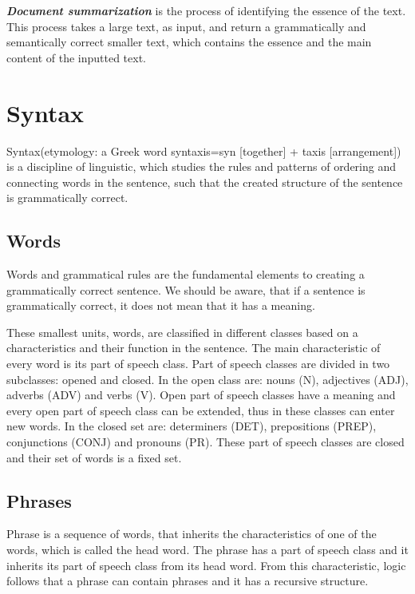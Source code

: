 \emph{\textbf{Document summarization}}  is the process of identifying the essence of the text. This process takes a large text, as input, and return a grammatically and semantically correct smaller text, which contains the essence and the main content of the inputted text. \\

\section{Syntax}

Syntax(etymology: a Greek word syntaxis=syn [together] + taxis [arrangement]) is a discipline of linguistic, which studies the rules and patterns of ordering and connecting words in the sentence, such that the created structure of the sentence is grammatically correct.

\subsection{Words}

Words and grammatical rules are the fundamental elements to creating a grammatically correct sentence. We should be aware, that if a sentence is grammatically correct, it does not mean that it has a meaning.

These smallest units, words, are classified in different classes based on a characteristics and their function in the sentence. The main characteristic of every word is its part of speech class. Part of speech classes are divided in two subclasses: opened and closed. In the open class are: nouns (N), adjectives (ADJ), adverbs (ADV) and verbs (V). Open part of speech classes have a meaning and every open part of speech class can be extended, thus in these  classes can enter new words. In the closed set are: determiners (DET), prepositions (PREP), conjunctions (CONJ) and pronouns (PR). These part of speech classes are closed and their set of words is a fixed set.

\subsection{Phrases}

Phrase is a sequence of words, that inherits the characteristics of one of the words, which is called the head word. The phrase has a part of speech class and it inherits its part of speech class from its head word. From this characteristic, logic follows that a phrase can contain phrases and it has a recursive structure.

